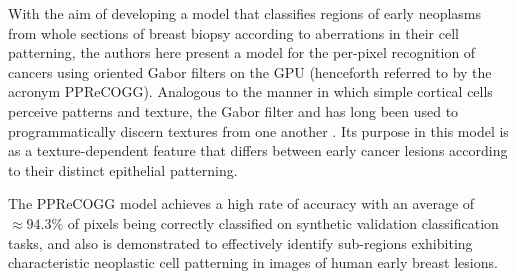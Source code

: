 With the aim of developing a model that classifies regions of early neoplasms from whole sections of breast biopsy according to aberrations in their cell patterning, the authors here present a model for the per-pixel recognition of cancers
using oriented Gabor filters on the GPU (henceforth referred to by the acronym
PPReCOGG). Analogous to the manner in which simple cortical cells perceive
patterns and texture, the Gabor filter and has long been used to
programmatically discern textures from one another
\citep{fogel1989, marcelja1980}. Its purpose in this model is as a
texture-dependent feature that differs between early cancer lesions according
to their distinct epithelial patterning.\par

The PPReCOGG model achieves a high rate of accuracy with an
average of $\approx94.3\%$ of pixels being correctly classified on synthetic
validation classification tasks, and also is demonstrated to effectively identify sub-regions exhibiting characteristic neoplastic cell patterning in images of human early breast lesions.




